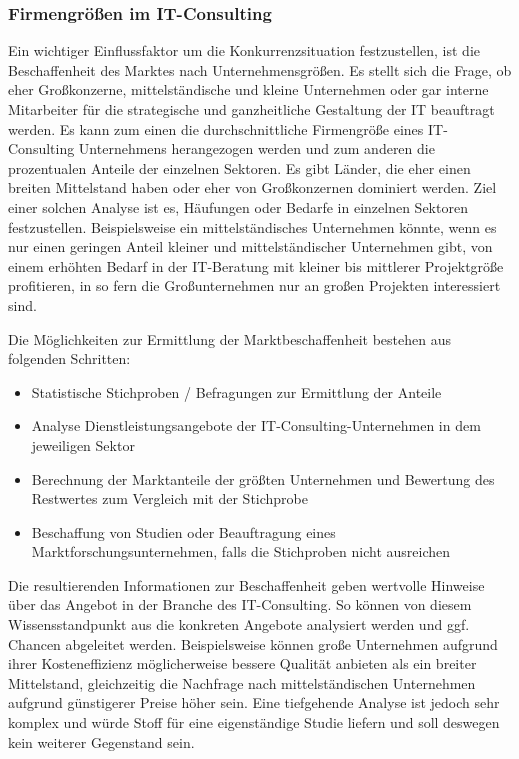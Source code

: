  \subsubsection{Firmengrößen im IT-Consulting}
Ein wichtiger Einflussfaktor um die Konkurrenzsituation festzustellen, ist die Beschaffenheit des Marktes nach Unternehmensgrößen.
 Es stellt sich die Frage, ob eher Großkonzerne, mittelständische und kleine  Unternehmen oder gar interne Mitarbeiter für die strategische und ganzheitliche Gestaltung der IT beauftragt werden.
Es kann zum einen die durchschnittliche Firmengröße eines IT-Consulting Unternehmens herangezogen werden  und zum anderen die prozentualen Anteile der einzelnen Sektoren.  Es gibt Länder, die eher einen breiten Mittelstand haben oder eher von Großkonzernen dominiert werden. 
Ziel einer solchen Analyse ist es, Häufungen oder Bedarfe in einzelnen Sektoren festzustellen. 
Beispielsweise ein mittelständisches Unternehmen könnte, wenn es nur einen geringen Anteil kleiner und mittelständischer Unternehmen gibt, von einem erhöhten Bedarf in der IT-Beratung mit kleiner bis mittlerer Projektgröße profitieren, in so fern die Großunternehmen nur an großen Projekten interessiert sind.

Die Möglichkeiten zur Ermittlung der Marktbeschaffenheit bestehen aus  folgenden Schritten:
\begin{itemize}
\item Statistische Stichproben / Befragungen zur Ermittlung der Anteile
\item Analyse Dienstleistungsangebote der IT-Consulting-Unternehmen in dem jeweiligen Sektor 
\item Berechnung der Marktanteile der größten Unternehmen und Bewertung des Restwertes zum Vergleich mit der Stichprobe
\item Beschaffung von Studien oder Beauftragung eines Marktforschungsunternehmen, falls die Stichproben nicht ausreichen
\end{itemize}
Die resultierenden Informationen zur Beschaffenheit geben wertvolle Hinweise über das Angebot in der Branche des IT-Consulting. 
So können von diesem Wissensstandpunkt aus die konkreten Angebote analysiert werden und ggf. Chancen abgeleitet werden. 
Beispielsweise können große Unternehmen aufgrund ihrer Kosteneffizienz möglicherweise bessere Qualität anbieten als ein breiter Mittelstand, gleichzeitig die Nachfrage nach mittelständischen Unternehmen aufgrund günstigerer Preise höher sein. 
Eine tiefgehende Analyse ist jedoch sehr komplex und würde Stoff für eine eigenständige Studie liefern und soll deswegen kein weiterer Gegenstand sein.


